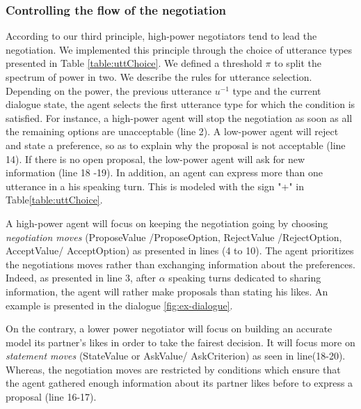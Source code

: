 \documentclass{llncs}
\begin{document}
		\subsubsection{Controlling the flow of the negotiation}
		According to our third principle, high-power negotiators tend to lead the negotiation. We implemented this principle through the choice of utterance types presented in Table \ref{table:uttChoice}.		
		We defined a threshold $\pi$ to split the spectrum of power in two. We describe the rules for utterance selection. Depending on the power, the previous utterance $u^{-1}$ type and the current dialogue state, the agent selects the first utterance type for which the condition is satisfied. For instance, a high-power agent will stop the negotiation as soon as all the remaining options are unacceptable (line 2). A low-power agent will reject and state a preference, so as to explain why the proposal is not acceptable (line 14). If there is no open proposal, the low-power agent will ask for new information (line 18 -19). In addition, an agent can express more than one utterance in a his speaking turn. This is modeled  with the sign "+" in Table\ref{table:uttChoice}.
		
		A high-power agent will focus on keeping the negotiation going by choosing \emph{negotiation moves} (ProposeValue /ProposeOption, RejectValue /RejectOption, AcceptValue/ AcceptOption) as presented in lines (4 to 10). The agent prioritizes the negotiations moves rather than exchanging information about the preferences. Indeed, as presented in line 3, after $\alpha$  speaking turns dedicated to sharing information, the agent will rather make proposals than stating his likes. An example is presented in the dialogue \ref{fig:ex-dialogue}. 
		
		On the contrary, a lower power negotiator will focus on building an accurate model its partner's likes in order to take the fairest decision. It will focus more on \emph{statement moves} (StateValue or AskValue/ AskCriterion) as seen in line(18-20). Whereas, the negotiation moves are restricted by conditions which ensure that the agent gathered enough information about its partner likes before to express a proposal (line 16-17).
		
\end{document}
